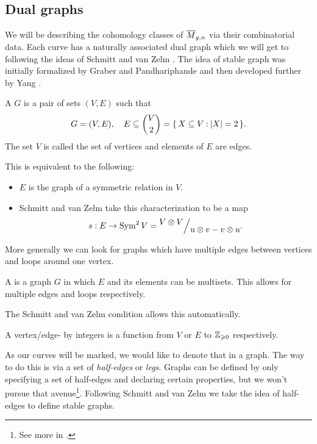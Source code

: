 \documentclass[12pt]{memoir}
\begin{document}
\subsection{Dual graphs}

We will be describing the cohomology classes of $\overline M_{g,n}$ via their combinatorial data. Each curve has a naturally associated dual graph which we will get to following the ideas of Schmitt and van Zelm \cite{SchmittVanZelm}. The idea of stable graph was initially formalized by Graber and Pandhariphande \cite{GraberPandharipande} and then developed further by Yang \cite{YangIntersections}.\par

\begin{Def}
    A  $G$ is a pair of sets $(V,E)$ such that  
    $$G=(V,E),\quad E\subseteq\binom{V}{2}=\{\,X\subseteq V\mathbin{:}\lvert X\rvert=2\,\}.$$
    The set $V$ is called the set of vertices and elements of $E$ are edges.
\end{Def}
This is equivalent to the following:
\begin{itemize}
    \item $E$ is the graph of a symmetric relation in $V$.
    \item  Schmitt and van Zelm take this characterization to be a map 
$$s:E\to\Sym^2 V=\quot{V\ox V}{u\ox v-v\ox u}.$$
\end{itemize} 

More generally we can look for graphs which have multiple edges between vertices and loops around one vertex.

\begin{Def}
A  is a graph $G$ in which $E$ and its elements can be multisets. This allows for multiple edges and loops respectively.    
\end{Def}

The Schmitt and van Zelm condition allows this automatically.

\begin{Def}
    A vertex/edge- by integers is a function from $V$ or $E$ to $\mathbb{Z}_{\geqslant 0}$ respectively. 
\end{Def}

As our curves will be marked, we would like to denote that in a graph. The way to do this is via a set of \emph{half-edges} or \emph{legs}. Graphs can be defined by only specifying a set of half-edges and declaring certain properties, but we won't pursue that avenue\footnote{See more in \href{https://math.stackexchange.com/q/2678435}{}.}. Following Schmitt and van Zelm we take the idea of half-edges to define stable graphs.
\end{document}
